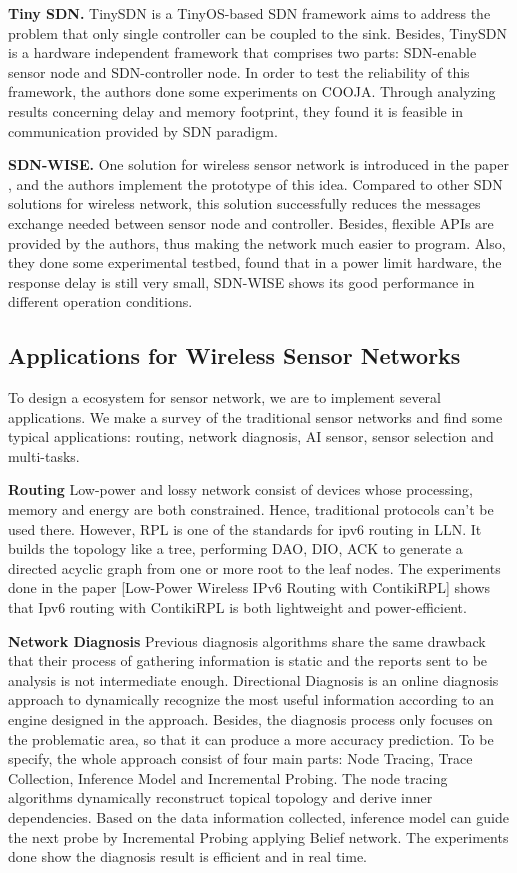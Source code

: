 \textbf{Tiny SDN.}
TinySDN \cite{de2015tinysdn} is a TinyOS-based SDN framework aims to address the problem that only single controller can be coupled to the sink. Besides, TinySDN is a hardware independent framework that comprises two parts: SDN-enable sensor node and SDN-controller node. In order to test the reliability of this framework, the authors done some experiments on COOJA. Through analyzing results concerning delay and memory footprint, they found it is feasible in communication provided by SDN paradigm.

\textbf{SDN-WISE.}
One solution for wireless sensor network is introduced in the paper \cite{galluccio2015sdn}, and the authors implement the prototype of this idea. Compared to other SDN solutions for wireless network, this solution successfully reduces the messages exchange needed between sensor node and controller. Besides, flexible APIs are provided by the authors, thus making the network much easier to program. Also, they done some experimental testbed, found that in a power limit hardware, the response delay is still very small, SDN-WISE shows its good performance in different operation conditions.


\subsection{Applications for Wireless Sensor Networks}

To design a ecosystem for sensor network, 
we are to implement several applications.  
We make a survey of the traditional sensor 
networks  and find some typical applications: 
routing, network diagnosis, AI sensor, sensor selection and multi-tasks.

\textbf{Routing}
Low-power and lossy network consist of devices whose processing, memory and energy are both constrained. Hence, traditional protocols can’t be used there. However, RPL is one of the standards for ipv6 routing in LLN. It builds the topology like a tree, performing DAO, DIO, ACK to generate a directed acyclic graph from one or more root to the leaf nodes. The experiments done in the paper [Low-Power Wireless IPv6 Routing with ContikiRPL] shows that Ipv6 routing with ContikiRPL is both lightweight and power-efficient.
 
\textbf{Network Diagnosis}
Previous diagnosis algorithms share the same drawback that their process of gathering information is static and the reports sent to be analysis is not intermediate enough. Directional Diagnosis is an online diagnosis approach to dynamically recognize the most useful information according to an engine designed in the approach. Besides, the diagnosis process only focuses on the problematic area, so that it can produce a more accuracy prediction. To be specify, the whole approach consist of four main parts: Node Tracing, Trace Collection, Inference Model and Incremental Probing. The node tracing algorithms dynamically reconstruct topical topology and derive inner dependencies. Based on the data information collected, inference model can guide the next probe by Incremental Probing applying Belief network. The experiments done show the diagnosis result is efficient and in real time.

